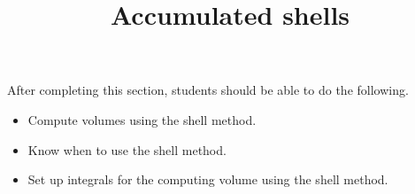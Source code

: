 \documentclass{ximera}
\title{Accumulated shells}
\begin{document}
\begin{abstract}
\end{abstract}

\maketitle

\begin{sectionOutcomes}

After completing this section, students should be able to do the following.

\begin{itemize}
\item Compute volumes using the shell method.
\item Know when to use the shell method.
\item Set up integrals for the computing volume using the shell method.
\end{itemize}

\end{sectionOutcomes}
\end{document}
